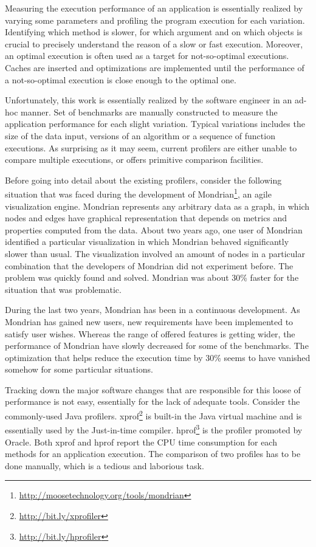 \documentclass{sig-alternate}
\begin{document}
Measuring the execution performance of an application is essentially realized by varying some parameters and profiling the program execution for each variation. Identifying which method is slower, for which argument and on which objects is crucial to precisely understand the reason of a slow or fast execution. Moreover, an optimal execution is often used as a target for not-so-optimal executions. Caches are inserted and optimizations are implemented until the performance of a not-so-optimal execution is close enough to the optimal one.

Unfortunately, this work is essentially realized by the software engineer in an ad-hoc manner. Set of benchmarks are manually constructed to measure the application performance for each slight variation. Typical variations includes the size of the data input, versions of an algorithm or a sequence of function executions. As surprising as it may seem, 
current profilers are either unable to compare multiple executions, or offers primitive comparison facilities.

Before going into detail about the existing profilers, consider the following situation that was faced during the development of Mondrian\footnote{\url{http://moosetechnology.org/tools/mondrian}}, an agile visualization engine. Mondrian represents any arbitrary data as a graph, in which nodes and edges have graphical representation that depends on metrics and properties computed from the data.
About two years ago, one user of Mondrian identified a particular visualization in which Mondrian behaved significantly slower than usual. The visualization involved an amount of nodes in a particular combination that the developers of Mondrian did not experiment before. The problem was quickly found and solved. Mondrian was about 30\% faster for the situation that was problematic. 

During the last two years, Mondrian has been in a continuous development. As Mondrian has gained new users, new requirements have been implemented to satisfy user wishes. Whereas the range of offered features is getting wider, the performance of Mondrian have slowly decreased for some of the benchmarks. The optimization that helps reduce the execution time by 30\% seems to have vanished somehow for some particular situations. 

Tracking down the major software changes that are responsible for this loose of performance is not easy, essentially for the lack of adequate tools. Consider the commonly-used Java profilers. xprof\footnote{\url{http://bit.ly/xprofiler}} is built-in the Java virtual machine and is essentially used by the Just-in-time compiler. hprof\footnote{\url{http://bit.ly/hprofiler}} is the profiler promoted by Oracle. Both xprof and hprof report the CPU time consumption for each methods for an application execution. The comparison of two profiles has to be done manually, which is a tedious and laborious task.
\end{document}
